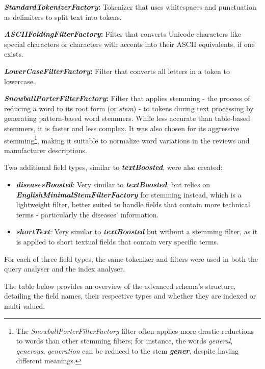 \documentclass[sigconf]{acmart}
\begin{document}
\begin{arrowlist}
	\item \textbf{\textit{StandardTokenizerFactory}:} Tokenizer that uses whitespaces and punctuation as delimiters to split text into tokens.
        \item \textbf{\textit{ASCIIFoldingFilterFactory}:} Filter that
    converts Unicode characters like special characters or characters with accents into their ASCII equivalents, if one exists.
	\item \textbf{\textit{LowerCaseFilterFactory}:} Filter that converts all letters in a token to lowercase.
	\item \textbf{\textit{SnowballPorterFilterFactory}:} Filter that applies stemming\cite{stemming} - the process of reducing a word to its root form (or \textit{stem}) - to tokens during text processing by generating pattern-based word stemmers. While less accurate than table-based stemmers, it is faster and less complex. It was also chosen for its aggressive stemming\footnote{The \textit{SnowballPorterFilterFactory} filter often applies more drastic reductions to words than other stemming filters; for instance, the words \textit{general}, \textit{generous}, \textit{generation} can be reduced to the stem \textit{\textbf{gener}}, despite having different meanings.}, making it suitable to normalize word variations in the reviews and manufacturer descriptions.
\end{arrowlist}

Two additional field types, similar to \textbf{\textit{textBoosted}}, were also created:

\begin{itemize}
        \item \textbf{\textit{diseasesBoosted}}: Very similar to
    \textbf{\textit{textBoosted}}, but relies on \textbf{\textit{EnglishMinimalStemFilterFactory}} for stemming instead, which is a lightweight filter, better suited to handle fields that contain more technical terms - particularly the diseases' information.
	\item \textbf{\textit{shortText}}: Very similar to \textbf{\textit{textBoosted}} but without a stemming filter, as it is applied to short textual fields that contain very specific terms.
\end{itemize}

For each of three field types, the same tokenizer and filters were used in both the query analyser and the index analyser.

The table below provides an overview of the advanced schema's structure, detailing the field names, their respective types and whether they are indexed or multi-valued.
\end{document}

